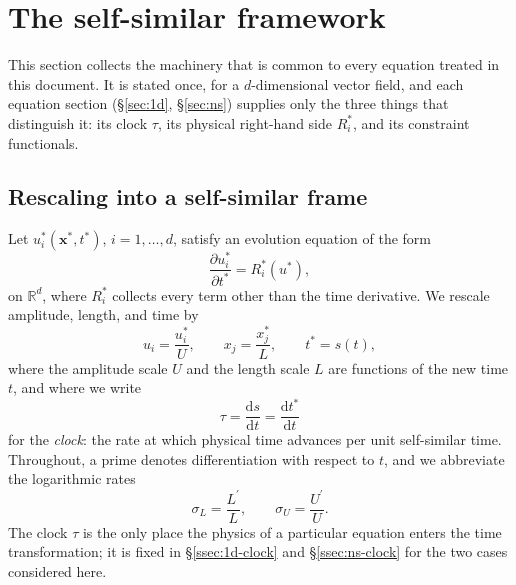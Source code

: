 \section{The self-similar framework}\label{sec:framework}

This section collects the machinery that is common to every equation treated
in this document. It is stated once, for a $d$-dimensional vector field, and
each equation section (\S\ref{sec:1d}, \S\ref{sec:ns}) supplies only the three
things that distinguish it: its clock $\tau$, its physical right-hand side
$R_i^*$, and its constraint functionals.

\subsection{Rescaling into a self-similar frame}\label{ssec:fw-rescaling}

Let $u_i^*(\mathbf{x}^*, t^*)$, $i = 1, \dots, d$, satisfy an evolution
equation of the form
\begin{equation}\label{eq:fw-general-pde}
  \frac{\partial u_i^*}{\partial t^*} = R_i^*(u^*),
\end{equation}
on $\mathbb{R}^d$, where $R_i^*$ collects every term other than the time
derivative. We rescale amplitude, length, and time by
\begin{equation}\label{eq:fw-nondim}
  u_i = \frac{u_i^*}{U}, \qquad
  x_j = \frac{x_j^*}{L}, \qquad
  t^* = s(t),
\end{equation}
where the amplitude scale $U$ and the length scale $L$ are functions of the
new time $t$, and where we write
\begin{equation}\label{eq:fw-clock}
  \tau = \frac{\mathrm{d} s}{\mathrm{d} t} = \frac{\mathrm{d} t^*}{\mathrm{d} t}
\end{equation}
for the \emph{clock}: the rate at which physical time advances per unit
self-similar time. Throughout, a prime denotes differentiation with respect
to $t$, and we abbreviate the logarithmic rates
\begin{equation}\label{eq:fw-rates}
  \sigma_L = \frac{L^\prime}{L}, \qquad \sigma_U = \frac{U^\prime}{U}.
\end{equation}
The clock $\tau$ is the only place the physics of a particular equation enters
the time transformation; it is fixed in \S\ref{ssec:1d-clock} and
\S\ref{ssec:ns-clock} for the two cases considered here.

